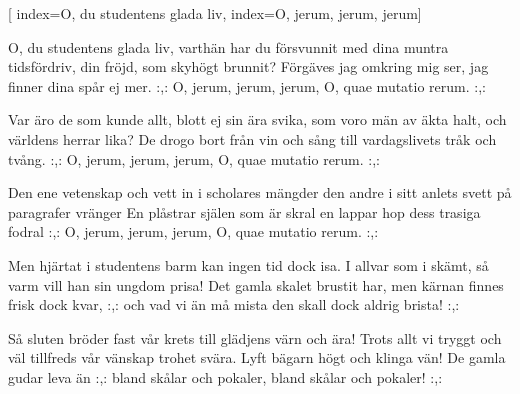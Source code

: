 [
	index={O, du studentens glada liv},
	index={O, jerum, jerum, jerum}]

\beginverse* 
O, du studentens glada liv,
varthän har du försvunnit
med dina muntra tidsfördriv,
din fröjd, som skyhögt brunnit?
Förgäves jag omkring mig ser,
jag finner dina spår ej mer.
:,: O, jerum, jerum, jerum,
O, quae mutatio rerum. :,:
\endverse

\beginverse* 
Var äro de som kunde allt,
blott ej sin ära svika,
som voro män av äkta halt,
och världens herrar lika?
De drogo bort från vin och sång
till vardagslivets tråk och tvång.
:,: O, jerum, jerum, jerum,
O, quae mutatio rerum. :,:
\endverse

\beginverse* 
Den ene vetenskap och vett
in i scholares mängder
den andre i sitt anlets svett
på paragrafer vränger
En plåstrar själen som är skral
en lappar hop dess trasiga fodral 
:,: O, jerum, jerum, jerum,
O, quae mutatio rerum. :,:
\endverse


\beginverse* 
Men hjärtat i studentens barm
kan ingen tid dock isa.
I allvar som i skämt, så varm
vill han sin ungdom prisa!
Det gamla skalet brustit har,
men kärnan finnes frisk dock kvar,
:,: och vad vi än må mista
den skall dock aldrig brista! :,:
\endverse

\beginverse* 
Så sluten bröder fast vår krets
till glädjens värn och ära!
Trots allt vi tryggt och väl tillfreds
vår vänskap trohet svära.
Lyft bägarn högt och klinga vän!
De gamla gudar leva än 
:,: bland skålar och pokaler,
bland skålar och pokaler! :,: 
\endverse
\endsong


